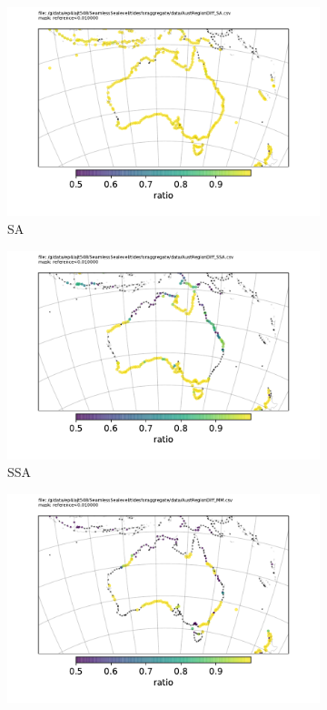 \begin{figure}[H]\centering
    \begin{subfigure}[b]{\figwidthHalf}
        \includegraphics[width=\textwidth]{figures/maps/AustRegionDiff_SA.pdf}
        \caption{SA}
    \end{subfigure}
    \begin{subfigure}[b]{\figwidthHalf}
        \includegraphics[width=\textwidth]{figures/maps/AustRegionDiff_SSA.pdf}
        \caption{SSA}
    \end{subfigure}
    \begin{subfigure}[b]{\figwidthHalf}
        \includegraphics[width=\textwidth]{figures/maps/AustRegionDiff_MM.pdf}

\end{subfigure}
\end{figure}
